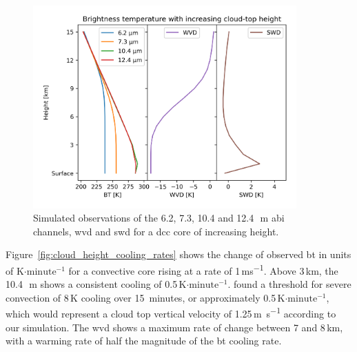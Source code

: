 \begin{figure}[tp]
    \includegraphics[width=0.9\textwidth]{figures/chapter1_06.png}
    \caption[
    Simulated observations of the 6.2, 7.3, 10.4 and 12.4\,\unit{\mu m} \acrshort{abi} channels, \acrshort{wvd} and \acrshort{swd} for a \acrshort{dcc} core of increasing height
    ]{
    Simulated observations of the 6.2, 7.3, 10.4 and 12.4\,\unit{\mu m} \acrshort{abi} channels, \acrshort{wvd} and \acrshort{swd} for a \acrshort{dcc} core of increasing height.
    }
    \label{fig:cloud_height_channels}
\end{figure}


Figure~\ref{fig:cloud_height_cooling_rates} shows the change of observed \acrshort{bt} in units of K$\cdot\mathrm{minute^{-1}}$ for a convective core rising at a rate of 1\,\unit{ms^{-1}}.
Above 3\,km, the 10.4\,\unit{\mu m} shows a consistent cooling of 0.5\,K$\cdot\mathrm{minute^{-1}}$.
\citet{roberts_nowcasting_2003} found a threshold for severe convection of 8\,\unit{K} cooling over 15~minutes, or approximately 0.5\,K$\cdot\mathrm{minute^{-1}}$, which would represent a cloud top vertical velocity of 1.25\,\unit{m s^{-1}} according to our simulation.
The \acrshort{wvd} shows a maximum rate of change between 7 and 8\,\unit{km}, with a warming rate of half the magnitude of the \acrshort{bt} cooling rate.


